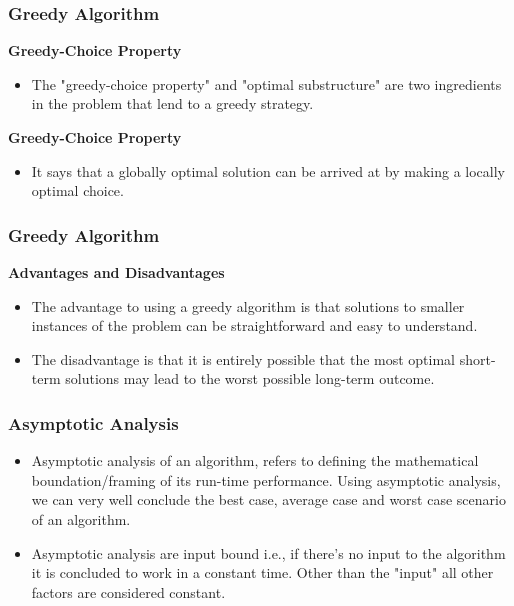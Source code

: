 \documentclass{beamer}
\begin{document}
\begin{frame}
	\frametitle{Greedy Algorithm}	
\vspace{-1cm}	
\noindent \textbf{Greedy-Choice Property}
\begin{itemize}
	\item 	The "greedy-choice property" and "optimal substructure" are two ingredients in the problem that lend to a greedy strategy.
\end{itemize}	

	
\noindent \textbf{Greedy-Choice Property}
\begin{itemize}
\item 	It says that a globally optimal solution can be arrived at by making a locally optimal choice.
\end{itemize}	

	
\end{frame}
\begin{frame}
	\frametitle{Greedy Algorithm}	
	
\noindent \textbf{Advantages and Disadvantages}
	
	
\begin{itemize}
	\item 	The advantage to using a greedy algorithm is that solutions to smaller instances of the problem can be straightforward and easy to understand. 
	\item The disadvantage is that it is entirely possible that the most optimal short-term solutions may lead to the worst possible long-term outcome.
\end{itemize}	

\end{frame}


\begin{frame}
	\frametitle{ Asymptotic Analysis}
	
	\begin{itemize}
		\item Asymptotic analysis of an algorithm, refers to defining the mathematical boundation/framing of its run-time performance. Using asymptotic analysis, we can very well conclude the best case, average case and worst case scenario of an algorithm.
		\item 
		Asymptotic analysis are input bound i.e., if there's no input to the algorithm it is concluded to work in a constant time. Other than the "input" all other factors are considered constant.
	\end{itemize}
\end{frame}
\end{document}
